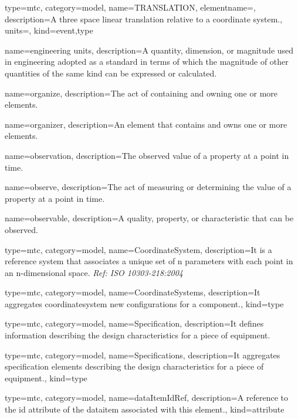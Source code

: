 {
  type=mtc,
  category=model,
  name={TRANSLATION},
  elementname=,
  description={A three space linear translation relative to a coordinate system.},
  units=,
  kind={event,type}
}


{
  name={engineering units},
  description={A quantity, dimension, or magnitude used in engineering adopted as a standard in terms of which the magnitude of other quantities of the same kind can be expressed or calculated.}
}


{
  name={organize},
  description={The act of containing and owning one or more elements.}
}


{
  name={organizer},
  description={An element that contains and owns one or more elements.}
}


{
  name={observation},
  description={The observed value of a property at a point in time.}
}


{
  name={observe},
  description={The act of measuring or determining the value of a property at a point in time.}
}


{
  name={observable},
  description={A quality, property, or characteristic that can be observed.}
}


{
  type=mtc,
  category=model,
  name={CoordinateSystem},
  description={It is a reference system that associates a unique set of n parameters with each point in an n-dimensional space. \textit{Ref: ISO 10303-218:2004}}
}


{
  type=mtc,
  category=model,
  name={CoordinateSystems},
  description={It aggregates \gls{coordinatesystem new} configurations for a \gls{component}.},
  kind={type}
}

{
  type=mtc,
  category=model,
  name={Specification},
  description={It defines information describing the design characteristics for a piece of equipment.}
}


{
  type=mtc,
  category=model,
  name={Specifications},
  description={It aggregates \gls{specification} elements describing the design characteristics for a piece of equipment.},
  kind={type}
}



{
  type=mtc,
  category=model,
  name={dataItemIdRef},
  description={A reference to the \gls{id} attribute of the \gls{dataitem} associated with this element.},
  kind={attribute}
}


